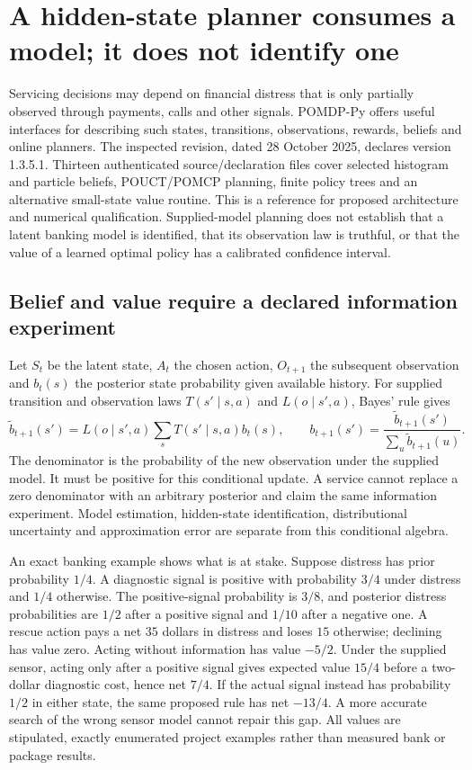 \section{A hidden-state planner consumes a model; it does not identify one}
\label{exec23:pomdppy-scope}
Servicing decisions may depend on financial distress that is only partially
observed through payments, calls and other signals. POMDP-Py offers useful
interfaces for describing such states, transitions, observations, rewards,
beliefs and online planners. The inspected revision, dated 28 October 2025,
declares version 1.3.5.1. Thirteen authenticated source/declaration files cover
selected histogram and particle beliefs, POUCT/POMCP planning, finite policy
trees and an alternative small-state value routine. This is a reference for
proposed architecture and numerical qualification. Supplied-model planning
does not establish that a latent banking model is identified, that its observation
law is truthful, or that the value of a learned optimal policy has a calibrated
confidence interval. \cite{exec23_pomdppy_sources}

\subsection{Belief and value require a declared information experiment}
\label{exec23:pomdppy-belief}
Let $S_t$ be the latent state, $A_t$ the chosen action, $O_{t+1}$ the subsequent
observation and $b_t(s)$ the posterior state probability given available
history. For supplied transition and observation laws $T(s'\mid s,a)$ and
$L(o\mid s',a)$, Bayes' rule gives
\[
 \widetilde b_{t+1}(s')=L(o\mid s',a)\sum_sT(s'\mid s,a)b_t(s),
 \qquad b_{t+1}(s')=\frac{\widetilde b_{t+1}(s')}
 {\sum_u\widetilde b_{t+1}(u)}.
\]
The denominator is the probability of the new observation under the supplied
model. It must be positive for this conditional update. A service cannot
replace a zero denominator with an arbitrary posterior and claim the same
information experiment. Model estimation, hidden-state identification,
distributional uncertainty and approximation error are separate from this
conditional algebra.

An exact banking example shows what is at stake. Suppose distress has prior
probability $1/4$. A diagnostic signal is positive with probability $3/4$ under
distress and $1/4$ otherwise. The positive-signal probability is $3/8$, and
posterior distress probabilities are $1/2$ after a positive signal and $1/10$
after a negative one. A rescue action pays a net $35$ dollars in distress and
loses $15$ otherwise; declining has value zero. Acting without information has
value $-5/2$. Under the supplied sensor, acting only after a positive signal
gives expected value $15/4$ before a two-dollar diagnostic cost, hence net
$7/4$. If the actual signal instead has probability $1/2$ in either state,
the same proposed rule has net $-13/4$. A more accurate search of the wrong
sensor model cannot repair this gap. All values are stipulated, exactly
enumerated project examples rather than measured bank or package results.
\cite{exec23_pomdppy_reference}

